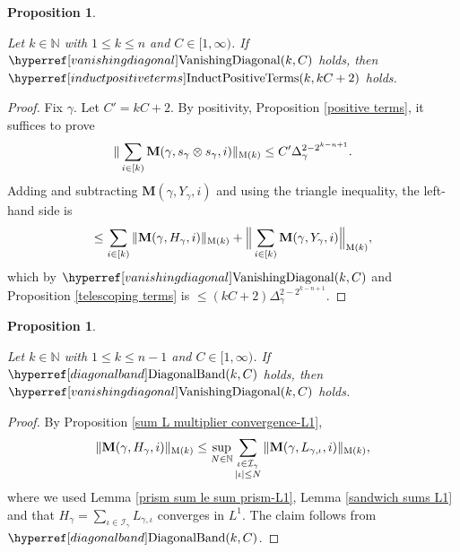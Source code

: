 \documentclass[12pt,reqno]{amsart}
\theoremstyle{plain}
\newtheorem{proposition}[theorem]{Proposition}
\numberwithin{equation}{section}
\theoremstyle{remark}
\newcommand{\uses}[1]{}
\newcommand{\usesdefs}[1]{}
\newcommand{\leanok}{}
\newcommand{\lean}[1]{}
\newcommand{\N}{{\mathbb N}}
\newcommand{\M}{\mathbf{M}}
\begin{document}
\begin{proposition}
\label{vanishing diagonal implies induct positive terms}\uses{positive terms,telescoping terms}\usesdefs{geometric parameters,kernel sequences,sandwich kernel,auto:Gaussian-difference-kernel-definition,s multiplier,H multiplier,induct positive terms,vanishing diagonal}
\lean{Auto.vanishingDiagonal_implies_inductPositiveTerms}
\leanok
Let $k\in\N$ with $1\le k\le n$ and $C\in [1,\infty)$.
If $\VanishingDiagonal{k,C}$ holds, then $\InductPositiveTerms{k,kC+2}$ holds.
\end{proposition}

\begin{proof}
Fix $\gamma$. Let $C'=kC+2$.
By  positivity, Proposition \ref{positive terms}, it suffices to prove
\begin{equation}
    \|\sum_{i\in [k)} \M(\gamma,s_\gamma \otimes s_\gamma,i)\|_{{\rm M}(k)}\le C' \Delta_\gamma^{2-2^{k-n+1}}.
\end{equation}
Adding and subtracting $\M(\gamma, Y_\gamma, i)$ and using the triangle inequality, the left-hand side is
\[
\le \sum_{i\in [k)} \|\M(\gamma, H_\gamma,i)\|_{{\rm M}(k)} + \Big\|\sum_{i\in [k)} \M(\gamma, Y_\gamma,i)\Big\|_{{\rm M}(k)},
\]
which by $\VanishingDiagonal{k,C}$ and Proposition \ref{telescoping terms} is
$\le (kC+2) \Delta_\gamma^{2-2^{k-n+1}}$.
\end{proof}

\begin{proposition}
\label{diagonal band implies vanishing diagonal}\uses{sum L multiplier convergence-L1,prism sum le sum prism-L1,sandwich sums L1}\usesdefs{kernel sequences,sandwich kernel,H multiplier,L multiplier,summation-definition,vanishing diagonal,diagonal band}
\lean{Auto.diagonalBand_implies_vanishingDiagonal}
\leanok
Let $k\in\N$ with $1\le k\le n-1$ and $C\in [1,\infty)$.
If $\DiagonalBand{k,C}$ holds, then $\VanishingDiagonal{k,C}$ holds.
\end{proposition}

\begin{proof}
By Proposition \ref{sum L multiplier convergence-L1},
\[ \|\M(\gamma,H_\gamma,i)\|_{{\rm M}(k)} \le \sup_{N\in\mathbb N}\sum_{\substack{\iota \in \mathcal{I}_{\gamma}\\|\iota|\le N}} \|\M(\gamma,L_{\gamma,\iota},i)\|_{{\rm M}(k)}, \]
where we used Lemma \ref{prism sum le sum prism-L1}, Lemma \ref{sandwich sums L1} and that $H_\gamma=\sum_{\iota\in \mathcal{I}_{\gamma}} L_{\gamma,\iota}$ converges in $L^1$.
The claim follows from $\DiagonalBand{k,C}$.
\end{proof}
\end{document}
